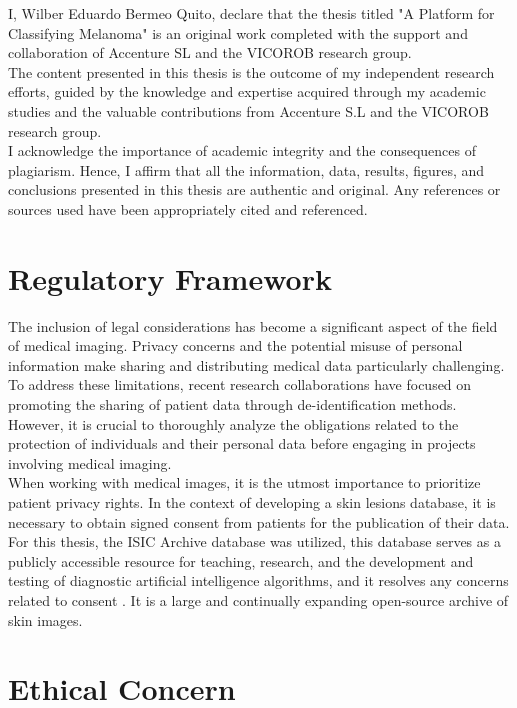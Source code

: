 I, Wilber Eduardo Bermeo Quito, declare that the thesis titled "A Platform for
Classifying Melanoma" is an original work completed with the support and
collaboration of Accenture SL and the VICOROB research group. \\

The content presented in this thesis is the outcome of my independent research
efforts, guided by the knowledge and expertise acquired through my academic
studies and the valuable contributions from Accenture S.L and the VICOROB
research group. \\

I acknowledge the importance of academic integrity and the consequences of
plagiarism. Hence, I affirm that all the information, data, results, figures,
and conclusions presented in this thesis are authentic and original. Any
references or sources used have been appropriately cited and referenced.

\section{Regulatory Framework}

The inclusion of legal considerations has become a significant aspect of the
field of medical imaging. Privacy concerns and the potential misuse of personal
information make sharing and distributing medical data particularly
challenging. To address these limitations, recent research collaborations have
focused on promoting the sharing of patient data through de-identification
methods. However, it is crucial to thoroughly analyze the obligations related
to the protection of individuals and their personal data before engaging in
projects involving medical imaging. \\

When working with medical images, it is the utmost importance to prioritize
patient privacy rights. In the context of developing a skin lesions database,
it is necessary to obtain signed consent from patients for the publication of
their data. For this thesis, the ISIC Archive database was utilized, this
database serves as a publicly accessible resource for teaching, research, and
the development and testing of diagnostic artificial intelligence algorithms,
and it resolves any concerns related to consent \cite{IsicArchive}. It is a
large and continually expanding open-source archive of skin images.

\section{Ethical Concern}

